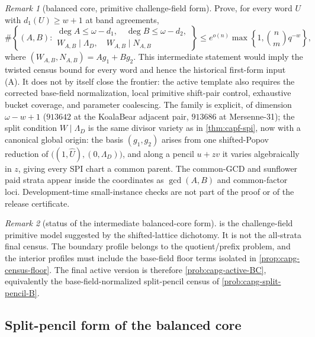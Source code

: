 \documentclass[11pt]{article}
\theoremstyle{definition}
\theoremstyle{remark}
\newtheorem{remark}[remark]{Remark}
\begin{document}
\begin{remark}[balanced core, primitive challenge-field form]\label{prob:capfp-balanced}
Prove, for every word $U$ with $d_1(U)\ge w+1$ at band agreements,
\[
        \#\left\{(A,B):
\begin{array}{l}
\deg A\le\omega-d_1,\quad \deg B\le\omega-d_2,\\
W_{A,B}\mid\Lambda_D,\quad W_{A,B}\mid N_{A,B}
\end{array}
\right\}
\le e^{o(n)}\max\left\{1,\binom nm q^{-w}\right\},
\]
where $(W_{A,B},N_{A,B})=Ag_1+Bg_2$.  This intermediate statement would imply the twisted census bound for every word and hence the historical first-form input \textup{(A)}.  It does not by itself close the frontier: the active template also requires the corrected base-field normalization, local primitive shift-pair control, exhaustive bucket coverage, and parameter coalescing.  The family is explicit, of dimension $\omega-w+1$ \textup($913642$ at the KoalaBear adjacent pair, $913686$ at Mersenne-31\textup); the split condition $W\mid\Lambda_D$ is the same divisor variety as in \cref{thm:capf-spi}, now with a canonical global origin: the basis $(g_1,g_2)$ arises from one shifted-Popov reduction of $\bigl((1,\widehat U),(0,\Lambda_D)\bigr)$, and along a pencil $u+zv$ it varies algebraically in $z$, giving every SPI chart a common parent.  The common-GCD and sunflower paid strata appear inside the coordinates as $\gcd(A,B)$ and common-factor loci.  Development-time small-instance checks are not part of the proof or of the release certificate.
\end{remark}


\begin{remark}[status of the intermediate balanced-core form]
\label{rem:capfp-balanced-active-reading}
 is the challenge-field primitive model suggested by
the shifted-lattice dichotomy.  It is not the all-strata final census.  The
boundary profile belongs to the quotient/prefix problem, and the interior
profiles must include the base-field floor terms isolated in
\cref{prop:capg-census-floor}.  The final active version is therefore
\cref{prob:capg-active-BC}, equivalently the base-field-normalized
split-pencil census of \cref{prob:capg-split-pencil-B}.
\end{remark}

\subsection{Split-pencil form of the balanced core}
\end{document}
